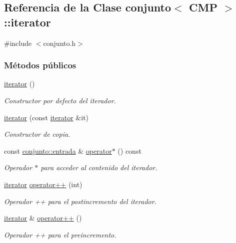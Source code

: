 \hypertarget{classconjunto_1_1iterator}{\subsection{Referencia de la Clase conjunto$<$ C\-M\-P $>$\-:\-:iterator}
\label{classconjunto_1_1iterator}
}


{\ttfamily \#include $<$conjunto.\-h$>$}

\subsubsection*{Métodos públicos}
\begin{DoxyCompactItemize}
\item 
\hyperlink{classconjunto_1_1iterator_a3f22236830d397ec750b795e4358492d}{iterator} ()
\begin{DoxyCompactList}\small\item\em Constructor por defecto del iterador. \end{DoxyCompactList}\item 
\hyperlink{classconjunto_1_1iterator_ae6ffce98c8835de978c7b8f0a769a1fe}{iterator} (const \hyperlink{classconjunto_1_1iterator}{iterator} \&it)
\begin{DoxyCompactList}\small\item\em Constructor de copia. \end{DoxyCompactList}\item 
const \hyperlink{classconjunto_a7630ace7cb17bcec07daf5804f1a0780}{conjunto\-::entrada} \& \hyperlink{classconjunto_1_1iterator_a910fa2559e5a4ac7adc764f8094ec969}{operator$\ast$} () const 
\begin{DoxyCompactList}\small\item\em Operador $\ast$ para acceder al contenido del iterador. \end{DoxyCompactList}\item 
\hyperlink{classconjunto_1_1iterator}{iterator} \hyperlink{classconjunto_1_1iterator_a02e7f1e03f9d4e6c05961c55453d0f49}{operator++} (int)
\begin{DoxyCompactList}\small\item\em Operador ++ para el postincremento del iterador. \end{DoxyCompactList}\item 
\hyperlink{classconjunto_1_1iterator}{iterator} \& \hyperlink{classconjunto_1_1iterator_ae653a4dd3bd1fd84c4dc3309916287aa}{operator++} ()
\begin{DoxyCompactList}\small\item\em Operador ++ para el preincremento. \end{DoxyCompactList}\item 

\end{DoxyCompactItemize}
